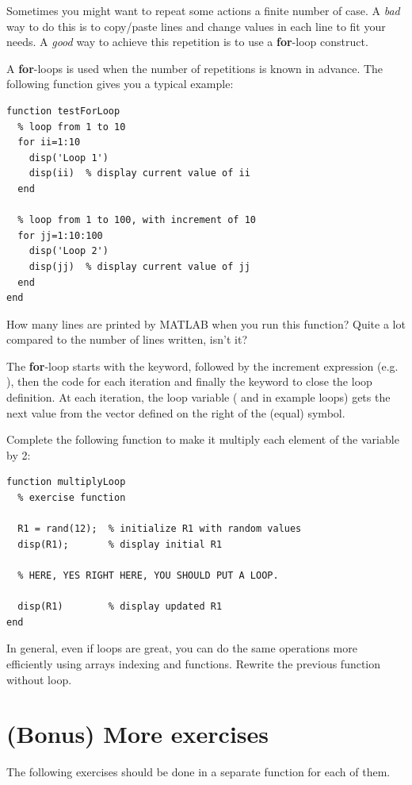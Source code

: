 \documentclass{article}
\begin{document}
Sometimes you might want to repeat some actions a finite number of case.
A \emph{bad} way to do this is to copy/paste lines and change values in each line to fit your needs.
A \emph{good} way to achieve this repetition is to use a \textbf{for}-loop construct.

A \textbf{for}-loops is used when the number of repetitions is known in advance.
The following function gives you a typical example:
\begin{lstlisting}
function testForLoop
  % loop from 1 to 10
  for ii=1:10
    disp('Loop 1')
    disp(ii)  % display current value of ii
  end

  % loop from 1 to 100, with increment of 10
  for jj=1:10:100
    disp('Loop 2')
    disp(jj)  % display current value of jj
  end
end
\end{lstlisting}

How many lines are printed by MATLAB when you run this function?
Quite a lot compared to the number of lines written, isn't it?

The \textbf{for}-loop starts with the  keyword, followed by the increment expression (e.g. ), then the code for each iteration and finally the  keyword to close the loop definition.
At each iteration, the loop variable ( and  in example loops) gets the next value from the vector defined on the right of the \mcode{=} (equal) symbol.

Complete the following function to make it multiply each element of the variable  by 2:
\begin{lstlisting}
function multiplyLoop
  % exercise function

  R1 = rand(12);  % initialize R1 with random values
  disp(R1);       % display initial R1

  % HERE, YES RIGHT HERE, YOU SHOULD PUT A LOOP.

  disp(R1)        % display updated R1
end
\end{lstlisting}

In general, even if loops are great, you can do the same operations more efficiently using arrays indexing and functions.
Rewrite the previous function  without loop.


\section{(Bonus) More exercises}

The following exercises should be done in a separate function for each of them.
\end{document}

